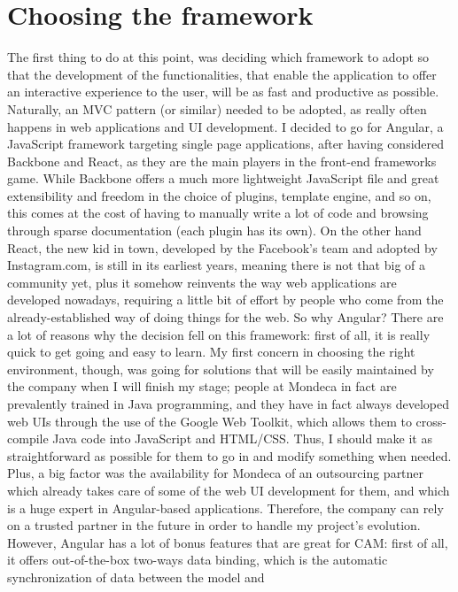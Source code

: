 \documentclass[12pt,oneside,svgnames]{memoir}
\begin{document}
\section{Choosing the framework}\label{choosing-the-framework}

The first thing to do at this point, was deciding which framework to
adopt so that the development of the functionalities, that enable the
application to offer an interactive experience to the user, will be as
fast and productive as possible. Naturally, an MVC pattern (or similar)
needed to be adopted, as really often happens in web applications and UI
development. I decided to go for Angular, a JavaScript framework
targeting single page applications, after having considered Backbone and
React, as they are the main players in the front-end frameworks game.
While Backbone offers a much more lightweight JavaScript file and great
extensibility and freedom in the choice of plugins, template engine, and
so on, this comes at the cost of having to manually write a lot of code
and browsing through sparse documentation (each plugin has its own). On
the other hand React, the new kid in town, developed by the Facebook's
team and adopted by Instagram.com, is still in its earliest years,
meaning there is not that big of a community yet, plus it somehow
reinvents the way web applications are developed nowadays, requiring a
little bit of effort by people who come from the already-established way
of doing things for the web. So why Angular? There are a lot of reasons
why the decision fell on this framework: first of all, it is really
quick to get going and easy to learn. My first concern in choosing the
right environment, though, was going for solutions that will be easily
maintained by the company when I will finish my stage; people at Mondeca
in fact are prevalently trained in Java programming, and they have in
fact always developed web UIs through the use of the Google Web Toolkit,
which allows them to cross-compile Java code into JavaScript and
HTML/CSS. Thus, I should make it as straightforward as possible for them
to go in and modify something when needed. Plus, a big factor was the
availability for Mondeca of an outsourcing partner which already takes
care of some of the web UI development for them, and which is a huge
expert in Angular-based applications. Therefore, the company can rely on
a trusted partner in the future in order to handle my project's
evolution. However, Angular has a lot of bonus features that are great
for CAM: first of all, it offers out-of-the-box two-ways data binding,
which is the automatic synchronization of data between the model and
\end{document}
